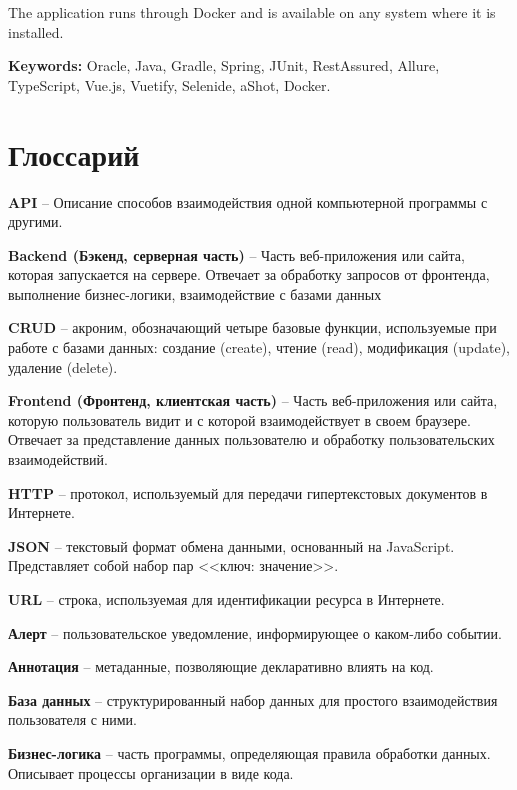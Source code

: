 \documentclass[a4paper,article]{article}
\begin{document}
\begin{sloppypar}
    The application runs through Docker and is available on any system where it is installed.

    \textbf{Keywords:} Oracle, Java, Gradle, Spring, JUnit, RestAssured, Allure, TypeScript, Vue.js, Vuetify, Selenide, aShot, Docker.
    

    \newpage

    \section*{Глоссарий}

    \textbf{API} -- Описание способов взаимодействия одной компьютерной программы с другими.

    \textbf{Backend (Бэкенд, серверная часть)} -- Часть веб-приложения или сайта, которая запускается на сервере. Отвечает за обработку запросов от фронтенда, выполнение бизнес-логики, взаимодействие с базами данных

    \textbf{CRUD} -- акроним, обозначающий четыре базовые функции, используемые при работе с базами данных: создание (create), чтение (read), модификация (update), удаление (delete).

    \textbf{Frontend (Фронтенд, клиентская часть)} -- Часть веб-приложения или сайта, которую пользователь видит и с которой взаимодействует в своем браузере. Отвечает за представление данных пользователю и обработку пользовательских взаимодействий.

    \textbf{HTTP} -- протокол, используемый для передачи гипертекстовых документов в Интернете.

    \textbf{JSON} -- текстовый формат обмена данными, основанный на JavaScript. Представляет собой набор пар <<ключ: значение>>.

    \textbf{URL} -- строка, используемая для идентификации ресурса в Интернете.

    \textbf{Алерт} -- пользовательское уведомление, информирующее о каком-либо событии.

    \textbf{Аннотация} -- метаданные, позволяющие декларативно влиять на код.

    \textbf{База данных} -- структурированный набор данных для простого взаимодействия пользователя с ними.

    \textbf{Бизнес-логика} -- часть программы, определяющая правила обработки данных. Описывает процессы организации в виде кода.


\end{sloppypar}
\end{document}
